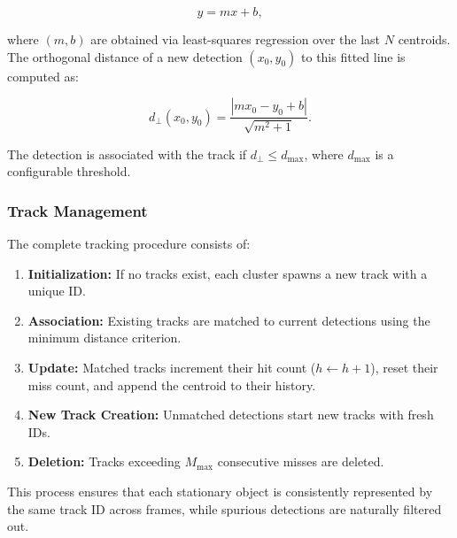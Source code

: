 \begin{equation}
    y = m x + b,
\end{equation}

where $(m,b)$ are obtained via least-squares regression over the last $N$ centroids.  
The orthogonal distance of a new detection $(x_0, y_0)$ to this fitted line is computed as:

\begin{equation}
    d_{\perp}(x_0, y_0) = \frac{|m x_0 - y_0 + b|}{\sqrt{m^2 + 1}}.
\end{equation}

The detection is associated with the track if $d_{\perp} \leq d_{\text{max}}$, where $d_{\text{max}}$ is a configurable threshold.

\subsubsection*{Track Management}
The complete tracking procedure consists of:
\begin{enumerate}
    \item \textbf{Initialization:} If no tracks exist, each cluster spawns a new track with a unique ID.
    \item \textbf{Association:} Existing tracks are matched to current detections using the minimum distance criterion.
    \item \textbf{Update:} Matched tracks increment their hit count ($h \leftarrow h+1$), reset their miss count, and append the centroid to their history.
    \item \textbf{New Track Creation:} Unmatched detections start new tracks with fresh IDs.
    \item \textbf{Deletion:} Tracks exceeding $M_{\text{max}}$ consecutive misses are deleted.
\end{enumerate}

This process ensures that each stationary object is consistently represented by the same track ID across frames, while spurious detections are naturally filtered out.

